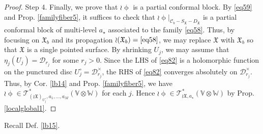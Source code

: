 \documentclass[11pt,b5paper,notitlepage]{article}
\theoremstyle{definition}
\newtheorem{rem}[df]{Remark}
\theoremstyle{plain}
\newcommand{\fk}{\mathfrak}
\newcommand{\mc}{\mathcal}
\newcommand{\SV}{\mathscr{V}}
\newcommand{\scr}{\mathscr}
\newcommand{\SX}{{S_{\fk X}}}
\newcommand{\DX}{D_{\fk X}}
\newcommand{\blt}{\bullet}
\newcommand{\Vbb}{\mathbb V}
\newcommand{\Wbb}{\mathbb W}
\newcommand{\Cbb}{\mathbb C}
\newcommand{\<}{\left\langle}
\renewcommand{\>}{\right\rangle}
\newcommand{\MO}{\mathcal{O}}
\newcommand{\MC}{\mathcal{C}}
\newcommand{\fx}{\mathfrak{X}}
\newcommand{\SW}{\mathscr{W}}
\newcommand{\MD}{\mathcal{D}}
\numberwithin{equation}{section}
\begin{document}
\begin{proof}
Step 4. Finally, we prove that $\wr \upphi$ is a partial conformal block. By \eqref{eq59} and Prop. \ref{familyfiber5}, it suffices to check that $\wr\upphi|_{\mc C_b-\SX-\DX}$ is a partial conformal block of multi-level $a_\star$ associated to the family \eqref{eq58}. Thus, by focusing on $\fk X_b$ and its propagation $\wr(\fk X_b)=\eqref{eq58}$, we may replace $\fk X$ with $\fk X_b$ so that $\fk X$ is a single pointed surface. By  shrinking $U_j$, we may assume that $\eta_j(U_j)=\MD_{r_j}$ for some $r_j>0$. Since the LHS of \eqref{eq82} is a holomorphic function on the punctured disc $U_j^\circ=\mc D_{r_j}^\times$, the RHS of \eqref{eq82} converges absolutely on $\mc D_{r_j}^\times$. Thus, by Cor. \ref{lb14} and Prop. \ref{familyfiber5}, we have $\wr\upphi\in\scr T_{(\wr{\fk X})_{U_j^\circ},a_1,\dots,a_M}^*(\Vbb\otimes\Wbb)$ for each $j$. Hence $\wr\upphi\in\scr T_{\wr{\fk X},a_\star}^*(\Vbb\otimes\Wbb)$ by Prop. \ref{localglobal1}.
\end{proof}



\begin{comment}
\begin{rem}\label{anotherversionpropagation}
    From the proof of (2), we actually find a global section $s\in H^0\big(\MC,(\SV_{\fx,a_1,\cdots,a_M}^{\leq k})^\vee(\blt S_\fx)\big)$. If we restrict $s$ to $\MC-S_\fx$, then $s$ defines an $\MO_{\MC-S_\fx}$-module morphism $\SV_{\fx,a_1,\cdots,a_M}^{\leq k}\otimes w\rightarrow \MO_{\MC-S_\fx}$. In this way, we actually get an $\MO_{\MC-S_\fx}$-module morphism
    $$
    \wr\upphi:\SV_{\fx,a_1,\cdots,a_M}\vert_{\MC-S_\fx}\otimes_\Cbb \SW_\fx(\Wbb)\rightarrow \MO_{\MC-S_\fx},
    $$
    which satisfies (\ref{eq82}). Its restriction to $\MC-S_\fx-D_\fx$ is the usual propagation given in Thm. \ref{lb71}. This version of propagation is sometimes more useful than that in Thm. \ref{lb71}.
\end{rem}
\end{comment}


Recall Def. \ref{lb15}.
\end{document}
